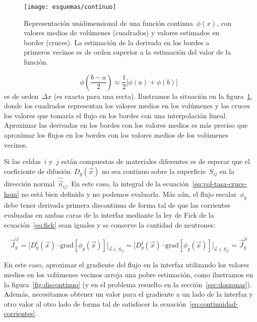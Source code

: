 \begin{figure}
 \begin{center}
  \texttt{[image: esquemas/continuo]}
 \end{center}
\caption{\label{fig:continuo}Representación unidimensional de una función continua~$\phi(x)$, con valores medios de volúmenes (cuadrados) y valores estimados en border (cruces). La estimación de la derivada en los bordes a primeros vecinos es de orden superior a la estimación del valor de la función.}
\end{figure}

\begin{equation*}
 \phi\left( \frac{b-a}{2} \right) \approx \frac{1}{2} \big[ \phi(a) + \phi(b) \big]
\end{equation*}
%
es de orden~$\Delta x$ (es exacta para una recta). Ilustramos la situación en la figura~\ref{fig:continuo}, donde los cuadrados representan los valores medios en los volúmenes y las cruces los valores que tomaría el flujo en los bordes con una interpolación lineal. Aproximar las derivadas en los bordes con los valores medios es más preciso que aproximar los flujos en los bordes con los valores medios de los volúmenes vecinos.

\medskip

Si las celdas~$i$ y~$j$ están compuestas de materiales diferentes es de esperar que el coeficiente de difusión~$D_g(\vec{x})$ no sea continuo sobre la superficie~$S_{ij}$ en la dirección normal~$\hat{\vec{n}}_{ij}$. En este caso, la integral de la ecuación~\eqref{eq:vol-tasa-cruce-hom} no está bien definida y no podemos evaluarla. Más aún, el flujo escalar~$\phi_g$ debe tener derivada primera discontinua de forma tal de que las corrientes evaluadas en ambas caras de la interfaz mediante la ley de Fick de la ecuación~\eqref{eq:fick} sean iguales y se conserve la cantidad de neutrones:

\begin{equation}\label{eq:continuidad-corrientes}
\vec{J}_{g}^{ij}
=
\Big[ D_g^i(\vec{x}) \cdot \text{grad} \left[\phi_g(\vec{x})\right] \Big]_{\vec{x} \in S_{ij}}
=
\Big[ D_g^j(\vec{x}) \cdot \text{grad} \left[\phi_g(\vec{x})\right] \Big]_{\vec{x} \in S_{ji}}
=
\vec{J}_{g}^{ji}
\end{equation}


En este caso, aproximar el gradiente del flujo en la interfaz utilizando los valores medios en los volúmenes vecinos arroja una pobre estimación, como ilustramos en la figura~\ref{fig:discontinuo} (y en el problema resuelto en la sección~\ref{sec:doszonas}). Además, necesitamos obtener un valor para el gradiente a un lado de la interfaz y otro valor al otro lado de forma tal de satisfacer la ecuación~\eqref{eq:continuidad-corrientes}.


